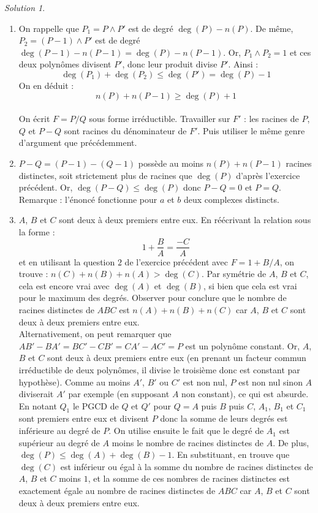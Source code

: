 \documentclass[french]{book}
\theoremstyle{definition}
\theoremstyle{remark}
\newtheorem*{sol}{Solution}
\begin{document}
\begin{sol}
	\begin{enumerate}
		\item On rappelle que $P_1=P\wedge P'$ est de degré $\deg(P)-n(P)$. De même, $P_2=(P-1)\wedge P'$ est de degré $\deg(P-1)-n(P-1)=\deg(P)-n(P-1)$. Or, $P_1\wedge P_2=1$ et ces deux polynômes divisent $P'$, donc leur produit divise $P'$. Ainsi : $$\deg(P_1)+\deg(P_2)\leqslant\deg(P')=\deg(P)-1$$ On en déduit : $$n(P)+n(P-1)\geqslant \deg(P)+1$$\\
		On écrit $F=P/Q$ sous forme irréductible. Travailler sur $F'$ : les racines de $P$, $Q$ et $P-Q$ sont racines du dénominateur de $F'$. Puis utiliser le même genre d'argument que précédemment.
		\item $P-Q=(P-1)-(Q-1)$ possède au moins $n(P)+n(P-1)$ racines distinctes, soit strictement plus de racines que $\deg(P)$ d'après l'exercice précédent. Or, $\deg(P-Q)\leqslant \deg(P)$ donc $P-Q=0$ et $P=Q$. \\
		Remarque : l'énoncé fonctionne pour $a$ et $b$ deux complexes distincts.
		\item $A$, $B$ et $C$ sont deux à deux premiers entre eux. En réécrivant la relation sous la forme : $$1+\frac{B}{A}=\frac{-C}{A}$$ et en utilisant la question $2$ de l'exercice précédent avec $F=1+B/A$, on trouve : $n(C)+n(B)+n(A)>\deg(C)$. Par symétrie de $A$, $B$ et $C$, cela est encore vrai avec $\deg(A)$ et $\deg(B)$, si bien que cela est vrai pour le maximum des degrés. Observer pour conclure que le nombre de racines distinctes de $ABC$ est $n(A)+n(B)+n(C)$ car $A$, $B$ et $C$ sont deux à deux premiers entre eux.\\
		Alternativement, on peut remarquer que $AB'-BA'=BC'-CB'=CA'-AC'=P$ est un polynôme constant. Or, $A$, $B$ et $C$ sont deux à deux premiers entre eux (en prenant un facteur commun irréductible de deux polynômes, il divise le troisième donc est constant par hypothèse). Comme au moins $A'$, $B'$ ou $C'$ est non nul, $P$ est non nul sinon $A$ diviserait $A'$ par exemple (en supposant $A$ non constant), ce qui est absurde. En notant $Q_1$ le PGCD de $Q$ et $Q'$ pour $Q=A$ puis $B$ puis $C$, $A_1$, $B_1$ et $C_1$ sont premiers entre eux et divisent $P$ donc la somme de leurs degrés est inférieure au degré de $P$. On utilise ensuite le fait que le degré de $A_1$ est supérieur au degré de $A$ moins le nombre de racines distinctes de $A$. De plus, $\deg(P)\leqslant\deg(A)+\deg(B)-1$. En substituant, en trouve que $\deg(C)$ est inférieur ou égal à la somme du nombre de racines distinctes de $A$, $B$ et $C$ moins $1$, et la somme de ces nombres de racines distinctes est exactement égale au nombre de racines distinctes de $ABC$ car $A$, $B$ et $C$ sont deux à deux premiers entre eux.

\end{enumerate}
\end{sol}
\end{document}
